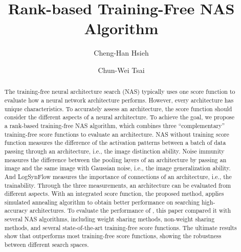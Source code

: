 \documentclass[sigconf]{acmart}
\begin{document}
\title{Rank-based Training-Free NAS Algorithm}

\author{Cheng-Han Hsieh}

\author{Chun-Wei Tsai}

\begin{abstract}
    The training-free neural architecture search (NAS) typically uses one  
    score function to evaluate how a neural network architecture performs. 
    However, every architecture has unique characteristics. To accurately 
    assess an architecture, the score function should consider the different 
    aspects of a neural architecture. 
    To achieve the goal, we propose a rank-based training-free NAS algorithm, 
    which combines three ``complementary'' training-free score functions to 
	evaluate an architecture. 
	NAS without training score function measures the difference 
    of the activation patterns between a batch of data passing through an 
    architecture, i.e., the image distinction ability. 
	Noise immunity measures the difference between the pooling layers 
    of an architecture by passing an image and the same image with Gaussian noise, 
    i.e., the image generalization ability. 
	And LogSynFlow measures the importance of connections of an architecture, 
    i.e., the trainability. 
    Through the three measurements, an architecture can be evaluated from 
    different aspects. With an integrated score function, the proposed 
    method, \palg{} applies simulated annealing algorithm to obtain 
    better performance on searching high-accuracy architectures. 
    To evaluate the performance of \palg{}, this paper compared 
    it with several NAS algorithms, including weight sharing methods, 
    non-weight sharing methods, and several state-of-the-art training-free 
    score functions. The ultimate results show that \palg{} outperforms most 
    training-free score functions, showing the robustness between different 
    search spaces. 

\end{abstract}
\maketitle
\end{document}
